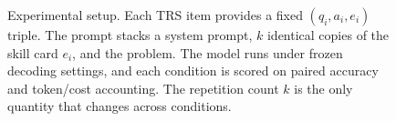 \begin{figure}[t]
{}
\caption{Experimental setup. Each TRS item provides a fixed $(q_i, a_i, e_i)$
triple. The prompt stacks a system prompt, $k$ identical copies of the skill
card $e_i$, and the problem. The model runs under frozen decoding settings, and
each condition is scored on paired accuracy and token/cost accounting. The
repetition count $k$ is the only quantity that changes across conditions.}
\label{fig:setup}
\end{figure}
